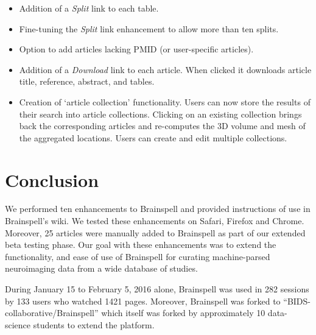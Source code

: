\documentclass[twocolumn]{bmcart}%
\providecommand{\tightlist}{%
  \setlength{\itemsep}{0pt}\setlength{\parskip}{0pt}}
\begin{document}
\begin{itemize}
\tightlist
\item
  Addition of a \emph{Split} link to each table.
\item
  Fine-tuning the \emph{Split} link enhancement to allow more than ten
  splits.
\item
  Option to add articles lacking PMID (or user-specific articles).
\item
  Addition of a \emph{Download} link to each article. When clicked it
  downloads article title, reference, abstract, and tables.
\item
  Creation of `article collection' functionality. Users can now store
  the results of their search into article collections. Clicking on an
  existing collection brings back the corresponding articles and
  re-computes the 3D volume and mesh of the aggregated locations. Users
  can create and edit multiple collections.
\end{itemize}

\section{Conclusion}\label{conclusion}

We performed ten enhancements to Brainspell and provided instructions of
use in Brainspell's wiki. We tested these enhancements on Safari,
Firefox and Chrome. Moreover, 25 articles were manually added to
Brainspell as part of our extended beta testing phase. Our goal with
these enhancements was to extend the functionality, and ease of use of
Brainspell for curating machine-parsed neuroimaging data from a wide
database of studies.

During January 15 to February 5, 2016 alone, Brainspell was used in 282
sessions by 133 users who watched 1421 pages. Moreover, Brainspell was
forked to ``BIDS-collaborative/Brainspell'' which itself was forked by
approximately 10 data-science students to extend the platform.

\end{document}
